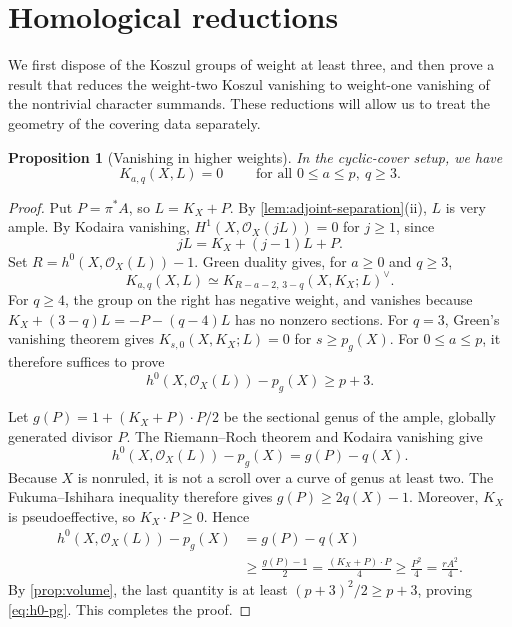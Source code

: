 \documentclass[11pt,reqno]{amsart}
\numberwithin{equation}{section}
\newtheorem{proposition}[proposition]{Proposition}
\theoremstyle{remark}
\newcommand{\sshf}[1]{\mathcal{O}_{#1}}
\begin{document}
\section{Homological reductions}\label{sec:homological}

We first dispose of the Koszul groups of weight at
least three, and then prove a result that reduces the weight-two Koszul vanishing to weight-one vanishing of the nontrivial character summands. These reductions will allow us to treat the geometry of the covering data separately.

\begin{proposition}[Vanishing in higher weights]\label{prop:high-weights}
In the cyclic-cover setup, we have
\[
  K_{a,q}(X,L)=0\qquad \text{ for all } 0\leq a\leq p,\ q\geq3.
\]
\end{proposition}

\begin{proof}
Put \(P=\pi^*A\), so \(L=K_X+P\). By
\cref{lem:adjoint-separation}\textup{(ii)}, \(L\) is very ample.
By Kodaira vanishing, \(H^1(X,\sshf{X}(jL))=0\) for \(j\geq1\),
since
\[
 jL=K_X+(j-1)L+P.
\]
Set \(R=h^0(X,\sshf{X}(L))-1\). Green duality \cite{Green} gives, for $a\ge 0$ and $q\ge 3$,
\begin{equation*}
 K_{a,q}(X,L)\simeq
 K_{R-a-2,\,3-q}(X,K_X;L)^\vee.
\end{equation*}
For \(q\geq4\), the group on the right has negative weight, and vanishes because
\(K_X+(3-q)L=-P-(q-4)L\) has no nonzero sections.
For \(q=3\), Green's vanishing theorem
\cite[Theorem~(3.a.1)]{Green} gives
\(K_{s,0}(X,K_X;L)=0\) for \(s\geq p_g(X)\). For \(0\leq a\leq p\), it therefore suffices to prove
\begin{equation}\label{eq:h0-pg}
 h^0(X,\sshf{X}(L))-p_g(X)\geq p+3.
\end{equation}

Let \(g(P)=1+(K_X+P)\cdot P/2\) be the sectional genus of the
ample, globally generated divisor \(P\). The Riemann--Roch theorem and Kodaira
vanishing give
\[
 h^0(X,\sshf{X}(L))-p_g(X)=g(P)-q(X).
\]
Because \(X\) is nonruled, it is not a scroll over a curve of genus at
least two. The Fukuma--Ishihara inequality
\cite[Proposition 4.1]{FukumaIshihara} therefore gives
\(g(P)\geq2q(X)-1\). Moreover, \(K_X\) is pseudoeffective, so
\(K_X\cdot P\geq0\). Hence
\begin{align*}
 h^0(X,\sshf{X}(L))-p_g(X)
 &=g(P)-q(X)\\
 &\geq\frac{g(P)-1}{2}
 =\frac{(K_X+P)\cdot P}{4}
 \geq\frac{P^2}{4}
 =\frac{rA^2}{4}.
\end{align*}
By \cref{prop:volume}, the last quantity is at least
\((p+3)^2/2\geq p+3\), proving \eqref{eq:h0-pg}. This completes the proof.
\end{proof}
\end{document}

